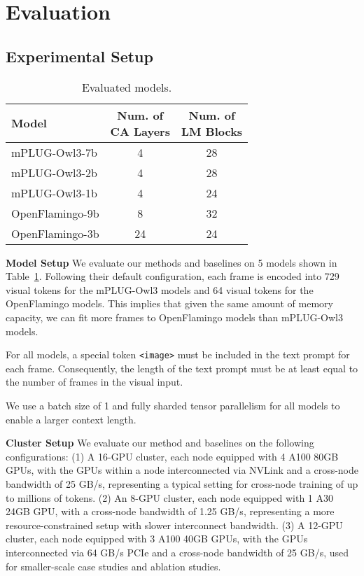 \section{Evaluation}
\label{sec:eval}
\newcommand{\highlight}[1]{{\leavevmode\textbf{#1}}}
\subsection{Experimental Setup}
\label{sec:eval/setup}
\begin{table}[tbp]
    \centering
    \caption{Evaluated models.}
    \begin{tabular}{l|c|c}
        \hline
         Model & \makecell{Num. of\\ CA Layers} & \makecell{Num. of\\ LM Blocks}\\ \hline
         mPLUG-Owl3-7b & 4 & 28 \\
         mPLUG-Owl3-2b & 4 & 28 \\
         mPLUG-Owl3-1b & 4 & 24 \\
         OpenFlamingo-9b & 8 & 32 \\
         OpenFlamingo-3b & 24 & 24 \\ \hline         
    \end{tabular}
    \label{tab:evaluated-models}
    \vspace{-2ex}
\end{table}
\textbf{Model Setup} We evaluate our methods and baselines on 5 models shown in Table~\ref{tab:evaluated-models}. Following their default configuration, each frame is encoded into 729 visual tokens for the mPLUG-Owl3 models and 64 visual tokens for the OpenFlamingo models. This implies that given the same amount of memory capacity, we can fit more frames to OpenFlamingo models than mPLUG-Owl3 models. 

For all models, a special token \texttt{<image>} must be included in the text prompt for each frame. Consequently, the length of the text prompt must be at least equal to the number of frames in the visual input. 

We use a batch size of 1 and fully sharded tensor parallelism for all models to enable a larger context length.

\textbf{Cluster Setup} We evaluate our method and baselines on the following configurations: (1) A 16-GPU cluster, each node equipped with 4 A100 80GB GPUs, with the GPUs within a node interconnected via NVLink and a cross-node bandwidth of 25 GB/s, representing a typical setting for cross-node training of up to millions of tokens. (2) An 8-GPU cluster, each node equipped with 1 A30 24GB GPU, with a cross-node bandwidth of 1.25 GB/s, representing a more resource-constrained setup with slower interconnect bandwidth. (3) A 12-GPU cluster, each node equipped with 3 A100 40GB GPUs, with the GPUs interconnected via 64 GB/s PCIe and a cross-node bandwidth of 25 GB/s, used for smaller-scale case studies and ablation studies.

